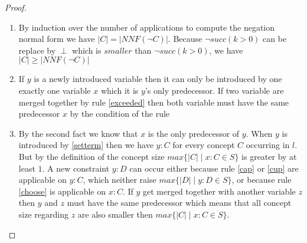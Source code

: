 \documentclass[a4paper,11pt]{scrartcl}
\theoremstyle{break}
\begin{document}
\begin{proof}$ $\\
\vspace*{-5mm}
\begin{enumerate}
\item By induction over the number of applications to compute the negation normal form we have $|C|=|NNF(\neg C)|$. Because $\neg succ(k>0)$ can be replace by $\perp$ which is $smaller$ than $\neg succ(k>0)$, we have $|C|\geq|NNF(\neg C)|$
\item If $y$ is a newly introduced variable then it can only be introduced by one exactly one variable $x$ which it is $y$'s only predecessor. If two variable are merged together by rule \ref{exceeded} then both variable must have the same predecessor $x$ by the condition of the rule
\item By the second fact we know that $x$ is the only predecessor of $y$. When $y$ is introduced by \ref{setterm} then we have $y:C$ for every concept $C$ occurring in $l$. But by the definition of the concept size $max\{|C|\mid x:C\in S\}$ is greater by at least $1$. A new constraint $y:D$ can occur either because rule \ref{cap} or \ref{cup} are applicable on $y:C$, which neither raise $max\{|D|\mid y:D \in S\}$, or because rule \ref{choose} is applicable on $x:C$. If $y$ get merged together with another variable $z$ then $y$ and $z$ must have the same predecessor which means that all concept size regarding $z$ are also smaller then $max\{|C|\mid x:C\in S\}$.
\end{enumerate}
\end{proof}
\end{document}
